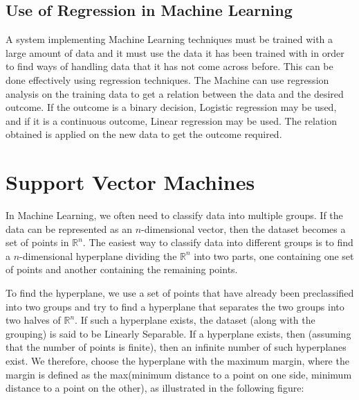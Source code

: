\documentclass[12 pt]{report}
\begin{document}
    \section{Use of Regression in Machine Learning}
    A system implementing Machine Learning techniques must be trained with a large amount of data and it must use the data it has been trained with 
    in order to find ways of handling data that it has not come across before. This can be done effectively using regression techniques. The Machine 
    can use regression analysis on the training data to get a relation between the data and the desired outcome. If the outcome is a binary decision, 
    Logistic regression may be used, and if it is a continuous outcome, Linear regression may be used. The relation obtained is applied on the new data 
    to get the outcome required.

    \chapter{Support Vector Machines}
    In Machine Learning, we often need to classify data into multiple groups. If the data can be represented as an $n$-dimensional vector, then 
    the dataset becomes a set of points in $\mathbb{R}^{n}$. The easiest way to classify data into different groups is to find a $n$-dimensional 
    hyperplane dividing the $\mathbb{R}^{n}$ into two parts, one containing one set of points and another containing the remaining points.

    To find the hyperplane, we use a set of points that have already been preclassified into two groups and try to find a hyperplane that separates the two 
    groups into two halves of $\mathbb{R}^{n}$. 
    If such a hyperplane exists, the dataset (along with the grouping) is said to be Linearly Separable.
    If a hyperplane exists, then (assuming that the number of points is finite), then an infinite number of such hyperplanes exist.
    We therefore, choose the hyperplane with the maximum margin, where the margin is defined as the max(minimum distance to a point on one side, minimum distance to a point on the other), 
    as illustrated in the following figure:
\end{document}
